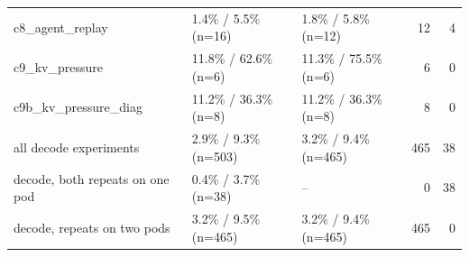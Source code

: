 \begin{table}[t]
\begin{tabular}{lllrr}
c8\_agent\_replay & 1.4\% / 5.5\% (n=16) & 1.8\% / 5.8\% (n=12) & 12 & 4 \\
c9\_kv\_pressure & 11.8\% / 62.6\% (n=6) & 11.3\% / 75.5\% (n=6) & 6 & 0 \\
c9b\_kv\_pressure\_diag & 11.2\% / 36.3\% (n=8) & 11.2\% / 36.3\% (n=8) & 8 & 0 \\
all decode experiments & 2.9\% / 9.3\% (n=503) & 3.2\% / 9.4\% (n=465) & 465 & 38 \\
decode, both repeats on one pod & 0.4\% / 3.7\% (n=38) & -- & 0 & 38 \\
decode, repeats on two pods & 3.2\% / 9.5\% (n=465) & 3.2\% / 9.4\% (n=465) & 465 & 0 \\
\bottomrule
\end{tabular}
\end{table}
